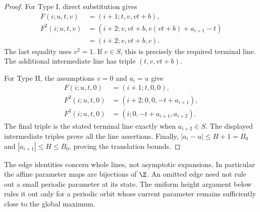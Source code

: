\begin{proof}
For Type I, direct substitution gives
\begin{align*}
 F(i;u,t,v)&=(i+1;t,v,vt+b),\\
 F^2(i;u,t,v)&=(i+2;v,vt+b,v(vt+b)+a_{i+1}-t)\\
             &=(i+2;v,vt+b,c).
\end{align*}
The last equality uses \(v^2=1\). If \(c\in S\), this is precisely
the required terminal line. The additional intermediate line has
triple \((t,v,vt+b)\).

For Type II, the assumptions \(v=0\) and \(a_i=u\) give
\begin{align*}
 F(i;u,t,0)&=(i+1;t,0,0),\\
 F^2(i;u,t,0)&=(i+2;0,0,-t+a_{i+1}),\\
 F^3(i;u,t,0)&=(i;0,-t+a_{i+1},a_{i+2}).
\end{align*}
The final triple is the stated terminal line exactly when
\(a_{i+2}\in S\). The displayed intermediate triples prove all the
line assertions. Finally, \(|a_i-u|\le H+1=B_0\) and
\(|a_{i+1}|\le H\le B_0\), proving the translation bounds.
\end{proof}

The edge identities concern whole lines, not asymptotic expansions.
In particular the affine parameter maps are bijections of \(\Z\).
An omitted edge need not rule out a small periodic parameter at its
state. The uniform height argument below rules it out only for a
periodic orbit whose current parameter remains sufficiently close to
the global maximum.

